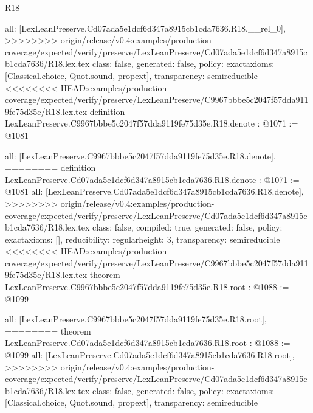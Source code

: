 \begin{lexlean}{R18}
\begin{coremodule}
{{{{{{{{{{{{  all: [LexLeanPreserve.Cd07ada5e1dcf6d347a8915cb1cda7636.R18.__rel_0],
>>>>>>>> origin/release/v0.4:examples/production-coverage/expected/verify/preserve/LexLeanPreserve/Cd07ada5e1dcf6d347a8915cb1cda7636/R18.lex.tex
  class: false,
  generated: false,
  policy: exact{axioms: [Classical.choice, Quot.sound, propext]},
  transparency: semireducible
}
<<<<<<<< HEAD:examples/production-coverage/expected/verify/preserve/LexLeanPreserve/C9967bbbe5c2047f57dda9119fe75d35e/R18.lex.tex
definition LexLeanPreserve.C9967bbbe5c2047f57dda9119fe75d35e.R18.denote : @1071 := @1081 {
  all: [LexLeanPreserve.C9967bbbe5c2047f57dda9119fe75d35e.R18.denote],
========
definition LexLeanPreserve.Cd07ada5e1dcf6d347a8915cb1cda7636.R18.denote : @1071 := @1081 {
  all: [LexLeanPreserve.Cd07ada5e1dcf6d347a8915cb1cda7636.R18.denote],
>>>>>>>> origin/release/v0.4:examples/production-coverage/expected/verify/preserve/LexLeanPreserve/Cd07ada5e1dcf6d347a8915cb1cda7636/R18.lex.tex
  class: false,
  compiled: true,
  generated: false,
  policy: exact{axioms: []},
  reducibility: regular{height: 3},
  transparency: semireducible
}
<<<<<<<< HEAD:examples/production-coverage/expected/verify/preserve/LexLeanPreserve/C9967bbbe5c2047f57dda9119fe75d35e/R18.lex.tex
theorem LexLeanPreserve.C9967bbbe5c2047f57dda9119fe75d35e.R18.root : @1088 := @1099 {
  all: [LexLeanPreserve.C9967bbbe5c2047f57dda9119fe75d35e.R18.root],
========
theorem LexLeanPreserve.Cd07ada5e1dcf6d347a8915cb1cda7636.R18.root : @1088 := @1099 {
  all: [LexLeanPreserve.Cd07ada5e1dcf6d347a8915cb1cda7636.R18.root],
>>>>>>>> origin/release/v0.4:examples/production-coverage/expected/verify/preserve/LexLeanPreserve/Cd07ada5e1dcf6d347a8915cb1cda7636/R18.lex.tex
  class: false,
  generated: false,
  policy: exact{axioms: [Classical.choice, Quot.sound, propext]},
  transparency: semireducible
}

}}}}}}}}}}}}}
\end{coremodule}
\end{lexlean}
